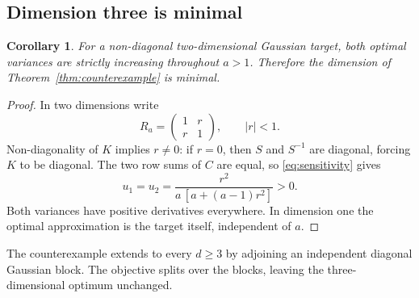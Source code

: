 \documentclass[11pt]{article}
\newtheorem{corollary}[theorem]{Corollary}
\theoremstyle{remark}\newtheorem{remark}[theorem]{Remark}
\begin{document}
\subsection{Dimension three is minimal}
\begin{corollary}\label{cor:minimal}
For a non-diagonal two-dimensional Gaussian target, both optimal variances are strictly increasing throughout $a>1$. Therefore the dimension of Theorem~\ref{thm:counterexample} is minimal.
\end{corollary}
\begin{proof}
In two dimensions write
\[
R_a=\begin{pmatrix}1&r\\r&1\end{pmatrix},\qquad |r|<1.
\]
Non-diagonality of $K$ implies $r\ne0$: if $r=0$, then $S$ and $S^{-1}$ are diagonal, forcing $K$ to be diagonal. The two row sums of $C$ are equal, so \eqref{eq:sensitivity} gives
\[
u_1=u_2=\frac{r^2}{a\,[a+(a-1)r^2]}>0.
\]
Both variances have positive derivatives everywhere. In dimension one the optimal approximation is the target itself, independent of $a$.
\end{proof}
The counterexample extends to every $d\geq3$ by adjoining an independent diagonal Gaussian block. The objective splits over the blocks, leaving the three-dimensional optimum unchanged.
\end{document}
